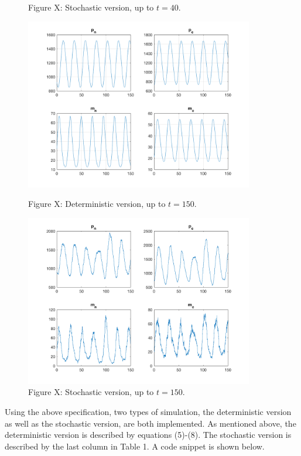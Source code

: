 \documentclass[12pt]{article}
\renewcommand{\(}{\left (}
\renewcommand{\)}{\right )}
\begin{document}
\begin{figure}[h]
\begin{minipage}{0.45\textwidth}
		\caption*{\small Figure X: Stochastic version, up to $t=40.$}
	\end{minipage}
	\begin{minipage}{0.45\textwidth}
		\centering
		\includegraphics[width=0.89\textwidth]{single_oscillator_zoom_out.png}
		\caption*{\small Figure X: Deterministic version, up to $t=150.$}
	\end{minipage}
	\begin{minipage}{0.45\textwidth}
		\centering
		\includegraphics[width=0.89\textwidth]{sto_single_oscillator_zoom_out.png}
		\caption*{\small Figure X: Stochastic version, up to $t=150.$}
	\end{minipage}

\end{figure}

Using the above specification, two types of simulation, the deterministic version as well as the stochastic version, are both implemented. As mentioned above, the deterministic version is described by equations (5)-(8). The stochastic version is described by the last column in Table 1. A code snippet is shown below.
\end{document}
